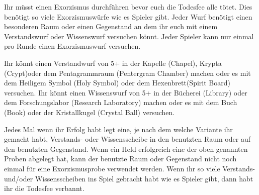 





Ihr müsst einen Exorzismus durchführen bevor euch die Todesfee alle tötet. Dies benötigt so viele Exorzismuswürfe wie es Spieler gibt. Jeder Wurf benötigt einen besonderen Raum oder einen Gegenstand an dem ihr euch mit einem Verstandswurf oder Wissenswurf versuchen könnt. Jeder Spieler kann nur einmal pro Runde einen Exorzismuswurf versuchen.

  \begin{itemize}
        \bitem Ihr könnt einen Verstandwurf von 5+ in der Kapelle (Chapel), Krypta (Crypt)oder dem Pentagrammraum (Pentergram Chamber) machen oder es mit dem Heiligem Symbol (Holy Symbol) oder dem Hexenbrett(Spirit Board) versuchen.
        \bitem  Ihr könnt einen Wissenswurf von 5+ in der Bücherei (Library) oder dem Forschungslabor (Research Laboratory) machen oder es mit dem Buch (Book) oder der Kristallkugel (Crystal Ball) versuchen.
    \end{itemize}

Jedes Mal wenn ihr Erfolg habt legt eine, je nach dem welche Variante ihr gemacht habt, Verstands- oder Wissensscheibe in den benutzten Raum oder auf den benutzten Gegenstand.
Wenn ein Held erfolgreich eine der oben genannten Proben abgelegt hat, kann der benutzte Raum oder Gegenstand nicht noch einmal für eine Exorzismusprobe verwendet werden.
Wenn ihr so viele Verstands- und/oder Wissensscheiben ins Spiel gebracht habt wie es Spieler gibt, dann habt ihr die Todesfee verbannt.

